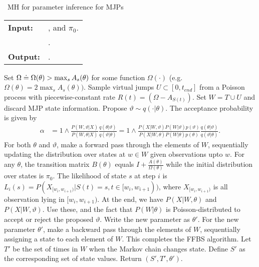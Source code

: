 \begin{algorithm}[H]
   \caption{\Naive\  MH for parameter inference for MJPs }
   \label{alg:MH_naive}
  \begin{tabular}{l l}
   \textbf{Input:  } & \text{Observations $X$}, 
                       \text{the MJP path $S(t) = (S, T)$, the  parameters $\theta$ }and $\pi_0$.\\ 
                     & \text{A  Metropolis-Hasting proposal $q(\cdot | \theta)$}.\\
   \textbf{Output:  }& \text{A new MJP trajectory $S'(t) = (S', T')$, 
                            new MJP parameters $\theta'$}.\\
   \hline
   \end{tabular}
   \begin{algorithmic}[1]
     \State Set $\Omega \doteq \Omega(\theta) > \max_s{A_s(\theta)}$ for
     some function $\Omega(\cdot)$ (e.g.\ $\Omega(\theta) = 
      2\max_s A_s(\theta))$.
      \State Sample virtual jumps $U\subset[0, t_{end}]$ from a 
      Poisson process with piecewise-constant rate 
      $R(t) = (\Omega - A_{S(t)})$. 
    Set $W = T \cup U$ and discard MJP state information.
      \State Propose $\vartheta \sim q(\cdot| \theta)$.
          The acceptance probability is given by 
          \vspace{-.05in}
          \begin{align*}
          \alpha &=  1 \wedge \frac{P(W,\vartheta| X)}{P(W, \theta| X)} \frac{q(\theta|\vartheta)}{q(\vartheta|\theta)}
          =  1 \wedge \frac{P(X| W,\vartheta) P(W | \vartheta)p(\vartheta)}
            {P(X|W, \theta)P(W | \theta)p(\theta)} \frac{q(\theta|\vartheta)}{q(\vartheta|\theta)}.
          \end{align*}
          \vspace{-.1in}
    \State For both $\theta$ and $\vartheta$, make a forward pass through the 
    elements of $W$, sequentially updating the distribution over states at 
    $w \in W$ given observations upto $w$. 
    For any $\theta$, the transition matrix 
    $B(\theta)$ equals $I + \frac{A(\theta)}{\Omega(\theta)}$ while the initial distribution
      over states is $\pi_0$. The likelihood of state $s$ at step $i$ is 
      $ L_i(s) = P(X_{[w_i, w_{i + 1})} | S(t) = s , t \in [w_i, w_{i + 1})) 
      $, where $X_{[w_i,w_{i+1})}$ is all observation lying in 
      $[w_i,w_{i+1})$. %
    At the end, we have 
    $P(X|W,\theta)$ and $P(X|W,\vartheta)$. Use these, and the fact that 
    $P(W|\theta)$ is Poisson-distributed to accept or reject the
    proposed $\vartheta$. Write the new parameter as $\theta'$.
    \State For the new parameter $\theta'$, make a backward pass through 
    the elements of
    $W$, sequentially assigning a state to each element of $W$. This
    completes the FFBS algorithm.
    \State Let $T'$ be the set of times in $W$ when the Markov chain changes state. Define $S'$ as the corresponding set of state values. Return $(S', T', \theta')$.
\end{algorithmic}
\end{algorithm}
\vspace{-.32in}
